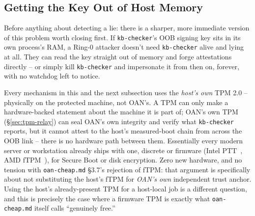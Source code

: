 \documentclass[11pt,a4paper]{article}
\begin{document}
\subsection{Getting the Key Out of Host Memory}
\label{sec:key-in-tpm}

Before anything about detecting a lie: there is a sharper, more
immediate version of this problem worth closing first. If
\texttt{kb-checker}'s OOB signing key sits in its own process's RAM, a
Ring-0 attacker doesn't need \texttt{kb-checker} alive and lying at
all. They can read the key straight out of memory and forge
attestations directly -- or simply kill \texttt{kb-checker} and
impersonate it from then on, forever, with no watchdog left to notice.

\begin{notebox}
Every mechanism in this and the next subsection uses the \emph{host's
own} TPM 2.0 -- physically on the protected machine, not OAN's. A TPM
can only make a hardware-backed statement about the machine it is
part of; OAN's own TPM (\S\ref{sec:tpm-relay}) can seal OAN's own
integrity and verify what \texttt{kb-checker} reports, but it cannot
attest to the host's measured-boot chain from across the OOB link --
there is no hardware path between them. Essentially every modern
server or workstation already ships with one, discrete or firmware
(Intel PTT~\cite{intelptt}, AMD fTPM~\cite{amdftpm}), for Secure Boot or disk encryption. Zero new
hardware, and no tension with \texttt{oan-cheap.md} \S3.7's rejection
of fTPM: that argument is specifically about not substituting the
host's fTPM for \emph{OAN's own} independent trust anchor. Using the
host's already-present TPM for a host-local job is a different
question, and this is precisely the case where a firmware TPM is
exactly what \texttt{oan-cheap.md} itself calls ``genuinely free.''
\end{notebox}
\end{document}
